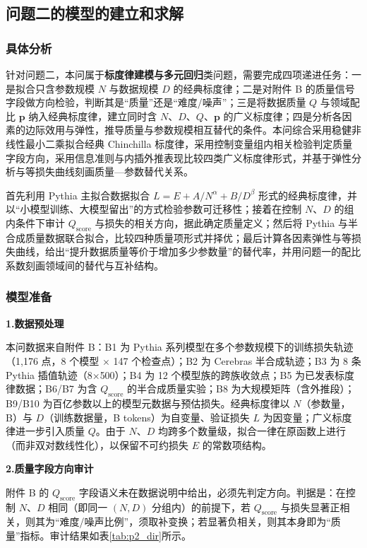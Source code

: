 \subsection{问题二的模型的建立和求解}

\subsubsection{具体分析}

针对问题二，本问属于\textbf{标度律建模与多元回归}类问题，需要完成四项递进任务：一是拟合只含参数规模 $N$ 与数据规模 $D$ 的经典标度律；二是对附件 B 的质量信号字段做方向检验，判断其是“质量”还是“难度/噪声”；三是将数据质量 $Q$ 与领域配比 $\bm p$ 纳入经典标度律，建立同时含 $N$、$D$、$Q$、$\bm p$ 的广义标度律\cite{muennighoff2023scaling}；四是分析各因素的边际效用与弹性，推导质量与参数规模相互替代的条件。本问综合采用稳健非线性最小二乘拟合经典 Chinchilla 标度律，采用控制变量组内相关检验判定质量字段方向，采用信息准则与内插外推表现比较四类广义标度律形式，并基于弹性分析与等损失曲线刻画质量—参数替代关系。

首先利用 Pythia 主拟合数据拟合 $L=E+A/N^{\alpha}+B/D^{\beta}$ 形式的经典标度律，并以“小模型训练、大模型留出”的方式检验参数可迁移性；接着在控制 $N$、$D$ 的组内条件下审计 $Q_{\text{score}}$ 与损失的相关方向，据此确定质量定义；然后将 Pythia 与半合成质量数据联合拟合，比较四种质量项形式并择优；最后计算各因素弹性与等损失曲线，给出“提升数据质量等价于增加多少参数量”的替代率，并用问题一的配比系数刻画领域间的替代与互补结构。

\subsubsection{模型准备}

\textbf{1.数据预处理}

本问数据来自附件 B：B1 为 Pythia 系列模型在多个参数规模下的训练损失轨迹（1{,}176 点，8 个模型 $\times$ 147 个检查点）\cite{biderman2023pythia}；B2 为 Cerebras 半合成轨迹；B3 为 8 条 Pythia 插值轨迹（8$\times$500）；B4 为 12 个模型族的跨族收敛点；B5 为已发表标度律数据；B6/B7 为含 $Q_{\text{score}}$ 的半合成质量实验；B8 为大规模矩阵（含外推段）；B9/B10 为百亿参数以上的模型元数据与预估损失。经典标度律以 $N$（参数量，B）与 $D$（训练数据量，B tokens）为自变量、验证损失 $L$ 为因变量；广义标度律进一步引入质量 $Q$。由于 $N$、$D$ 均跨多个数量级，拟合一律在原函数上进行（而非双对数线性化），以保留不可约损失 $E$ 的常数项结构。

\textbf{2.质量字段方向审计}

附件 B 的 $Q_{\text{score}}$ 字段语义未在数据说明中给出，必须先判定方向。判据是：在控制 $N$、$D$ 相同（即同一 $(N,D)$ 分组内）的前提下，若 $Q_{\text{score}}$ 与损失显著正相关，则其为“难度/噪声比例”，须取补变换；若显著负相关，则其本身即为“质量”指标。审计结果如表\ref{tab:p2_dir}所示。

